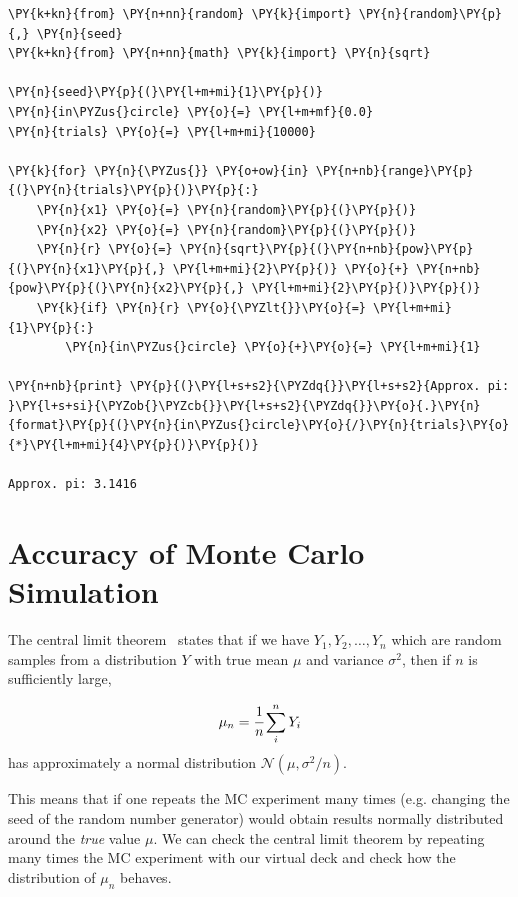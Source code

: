 \begin{codebox}[breakable, size=fbox, boxrule=1pt, pad at break*=1mm,colback=cellbackground, colframe=cellborder]
\begin{Verbatim}[commandchars=\\\{\}]
\PY{k+kn}{from} \PY{n+nn}{random} \PY{k}{import} \PY{n}{random}\PY{p}{,} \PY{n}{seed}
\PY{k+kn}{from} \PY{n+nn}{math} \PY{k}{import} \PY{n}{sqrt}
	
\PY{n}{seed}\PY{p}{(}\PY{l+m+mi}{1}\PY{p}{)}
\PY{n}{in\PYZus{}circle} \PY{o}{=} \PY{l+m+mf}{0.0}
\PY{n}{trials} \PY{o}{=} \PY{l+m+mi}{10000}
	
\PY{k}{for} \PY{n}{\PYZus{}} \PY{o+ow}{in} \PY{n+nb}{range}\PY{p}{(}\PY{n}{trials}\PY{p}{)}\PY{p}{:}
    \PY{n}{x1} \PY{o}{=} \PY{n}{random}\PY{p}{(}\PY{p}{)}
    \PY{n}{x2} \PY{o}{=} \PY{n}{random}\PY{p}{(}\PY{p}{)}
    \PY{n}{r} \PY{o}{=} \PY{n}{sqrt}\PY{p}{(}\PY{n+nb}{pow}\PY{p}{(}\PY{n}{x1}\PY{p}{,} \PY{l+m+mi}{2}\PY{p}{)} \PY{o}{+} \PY{n+nb}{pow}\PY{p}{(}\PY{n}{x2}\PY{p}{,} \PY{l+m+mi}{2}\PY{p}{)}\PY{p}{)}
    \PY{k}{if} \PY{n}{r} \PY{o}{\PYZlt{}}\PY{o}{=} \PY{l+m+mi}{1}\PY{p}{:}
        \PY{n}{in\PYZus{}circle} \PY{o}{+}\PY{o}{=} \PY{l+m+mi}{1}
	
\PY{n+nb}{print} \PY{p}{(}\PY{l+s+s2}{\PYZdq{}}\PY{l+s+s2}{Approx. pi: }\PY{l+s+si}{\PYZob{}\PYZcb{}}\PY{l+s+s2}{\PYZdq{}}\PY{o}{.}\PY{n}{format}\PY{p}{(}\PY{n}{in\PYZus{}circle}\PY{o}{/}\PY{n}{trials}\PY{o}{*}\PY{l+m+mi}{4}\PY{p}{)}\PY{p}{)}

Approx. pi: 3.1416
\end{Verbatim}
\end{codebox}

\section{Accuracy of Monte Carlo Simulation}
\label{sec:confidence_interval}

The central limit theorem~\cite{bib:central_limit} states that if we have
\(Y_1, Y_2,\dots, Y_n\) which are random samples from a distribution
\(Y\) with true mean \(\mu\) and variance \(\sigma^{2}\), then if \(n\)
is sufficiently large,

\begin{equation*} 
\mu_n = \cfrac{1}{n}\sum_i^n Y_i
\end{equation*}
 has approximately a normal distribution \(\mathcal{N}(\mu, \sigma^2/n)\).

This means that if one repeats the MC experiment many times 
(e.g. changing the seed of the random number generator) would obtain results normally distributed around the \emph{true} value \(\mu\).
We can check the central limit theorem by repeating many times the
MC experiment with our virtual deck and check how the distribution of $\mu_n$ behaves.

